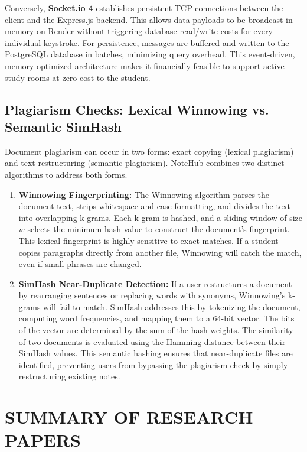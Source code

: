\documentclass[12,Times new Roman,a4paper]{report}
\begin{document}
Conversely, \textbf{Socket.io 4} establishes persistent TCP connections between the client and the Express.js backend. This allows data payloads to be broadcast in memory on Render without triggering database read/write costs for every individual keystroke. For persistence, messages are buffered and written to the PostgreSQL database in batches, minimizing query overhead. This event-driven, memory-optimized architecture makes it financially feasible to support active study rooms at zero cost to the student.

\subsection{Plagiarism Checks: Lexical Winnowing vs. Semantic SimHash}
Document plagiarism can occur in two forms: exact copying (lexical plagiarism) and text restructuring (semantic plagiarism). NoteHub combines two distinct algorithms to address both forms.
\begin{enumerate}
    \item \textbf{Winnowing Fingerprinting:} The Winnowing algorithm parses the document text, strips whitespace and case formatting, and divides the text into overlapping k-grams. Each k-gram is hashed, and a sliding window of size $w$ selects the minimum hash value to construct the document's fingerprint. This lexical fingerprint is highly sensitive to exact matches. If a student copies paragraphs directly from another file, Winnowing will catch the match, even if small phrases are changed.
    
    \item \textbf{SimHash Near-Duplicate Detection:} If a user restructures a document by rearranging sentences or replacing words with synonyms, Winnowing's k-grams will fail to match. SimHash addresses this by tokenizing the document, computing word frequencies, and mapping them to a 64-bit vector. The bits of the vector are determined by the sum of the hash weights. The similarity of two documents is evaluated using the Hamming distance between their SimHash values. This semantic hashing ensures that near-duplicate files are identified, preventing users from bypassing the plagiarism check by simply restructuring existing notes.
\end{enumerate}

\section{SUMMARY OF RESEARCH PAPERS}
\end{document}
